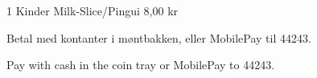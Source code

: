 \documentclass{article}
\begin{document}
1 Kinder Milk-Slice/Pingui
\hfill 8,00 kr
%
%
%
%
%
%
%
%
%
%
%
%
%
%
%
%

\vspace{0.5cm}

\begin{center}
\Large\bf

Betal med kontanter i møntbakken, eller MobilePay til 44243.

{\english Pay with cash in the coin tray or MobilePay to 44243.}

\end{center}

\underskriv
\end{document}
